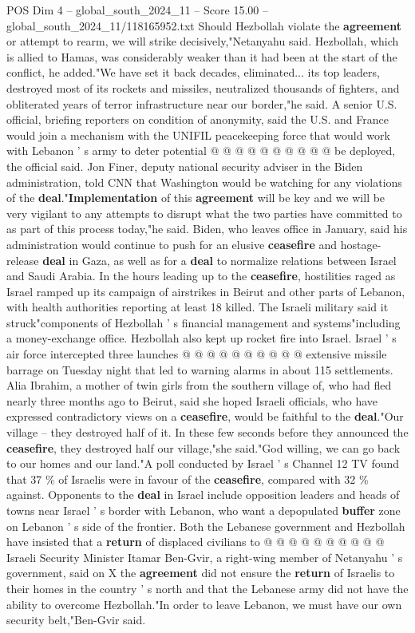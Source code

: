 \begin{textsample}{POS Dim 4 – global\_south\_2024\_11 – Score 15.00 – global\_south\_2024\_11/118165952.txt}
Should Hezbollah violate the \textbf{agreement} or attempt to rearm, we will strike decisively,"Netanyahu said.
Hezbollah, which is allied to Hamas, was considerably weaker than it had been at the start of the conflict, he added."We have set it back decades, eliminated... its top leaders, destroyed most of its rockets and missiles, neutralized thousands of fighters, and obliterated years of terror infrastructure near our border,"he said.
A senior U.S. official, briefing reporters on condition of anonymity, said the U.S. and France would join a mechanism with the UNIFIL peacekeeping force that would work with Lebanon ' s army to deter potential @ @ @ @ @ @ @ @ @ @ be deployed, the official said.
Jon Finer, deputy national security adviser in the Biden administration, told CNN that Washington would be watching for any violations of the \textbf{deal}."\textbf{Implementation} of this \textbf{agreement} will be key and we will be very vigilant to any attempts to disrupt what the two parties have committed to as part of this process today,"he said.
Biden, who leaves office in January, said his administration would continue to push for an elusive \textbf{ceasefire} and hostage-release \textbf{deal} in Gaza, as well as for a \textbf{deal} to normalize relations between Israel and Saudi Arabia.
In the hours leading up to the \textbf{ceasefire}, hostilities raged as Israel ramped up its campaign of airstrikes in Beirut and other parts of Lebanon, with health authorities reporting at least 18 killed.
The Israeli military said it struck"components of Hezbollah ' s financial management and systems"including a money-exchange office.
Hezbollah also kept up rocket fire into Israel.
Israel ' s air force intercepted three launches @ @ @ @ @ @ @ @ @ @ extensive missile barrage on Tuesday night that led to warning alarms in about 115 settlements.
Alia Ibrahim, a mother of twin girls from the southern village of, who had fled nearly three months ago to Beirut, said she hoped Israeli officials, who have expressed contradictory views on a \textbf{ceasefire}, would be faithful to the \textbf{deal}."Our village -- they destroyed half of it.
In these few seconds before they announced the \textbf{ceasefire}, they destroyed half our village,"she said."God willing, we can go back to our homes and our land."A poll conducted by Israel ' s Channel 12 TV found that 37 \% of Israelis were in favour of the \textbf{ceasefire}, compared with 32 \% against.
Opponents to the \textbf{deal} in Israel include opposition leaders and heads of towns near Israel ' s border with Lebanon, who want a depopulated \textbf{buffer} zone on Lebanon ' s side of the frontier.
Both the Lebanese government and Hezbollah have insisted that a \textbf{return} of displaced civilians to @ @ @ @ @ @ @ @ @ @ Israeli Security Minister Itamar Ben-Gvir, a right-wing member of Netanyahu ' s government, said on X the \textbf{agreement} did not ensure the \textbf{return} of Israelis to their homes in the country ' s north and that the Lebanese army did not have the ability to overcome Hezbollah."In order to leave Lebanon, we must have our own security belt,"Ben-Gvir said.


\end{textsample}
